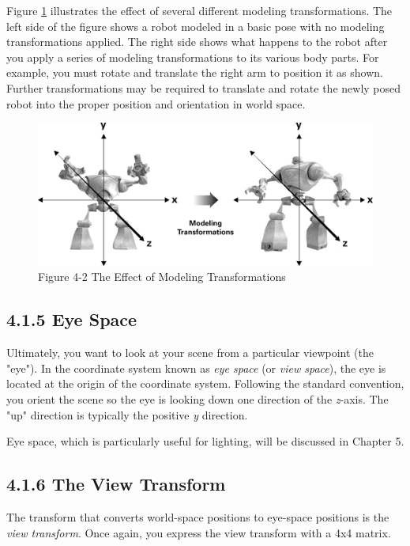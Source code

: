 \documentclass{book}
\begin{document}
Figure \ref{fig:4-2} illustrates the effect of several different modeling transformations. The left side of the figure shows a robot modeled in a basic pose with no modeling transformations applied. The right side shows what happens to the robot after you apply a series of modeling transformations to its various body parts. For example, you must rotate and translate the right arm to position it as shown. Further transformations may be required to translate and rotate the newly posed robot into the proper position and orientation in world space.
\begin{figure}
    \centering
    \includegraphics[width=1\linewidth]{Images/fig4_2.jpg}
    \caption{Figure 4-2 The Effect of Modeling Transformations}
    \label{fig:4-2}
\end{figure}

\subsection{4.1.5 Eye Space}

Ultimately, you want to look at your scene from a particular viewpoint (the "eye"). In the coordinate system known as \textit{eye space} (or \textit{view space}), the eye is located at the origin of the coordinate system. Following the standard convention, you orient the scene so the eye is looking down one direction of the \textit{z}-axis. The "up" direction is typically the positive \textit{y} direction.

Eye space, which is particularly useful for lighting, will be discussed in Chapter 5.

\subsection{4.1.6 The View Transform}

The transform that converts world-space positions to eye-space positions is the \textit{view transform}. Once again, you express the view transform with a 4x4 matrix.
\end{document}
